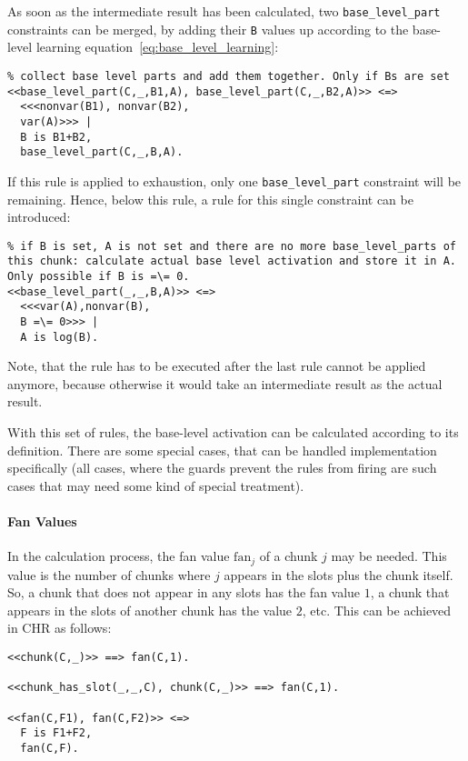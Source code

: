 As soon as the intermediate result has been calculated, two \verb|base_level_part| constraints can be merged, by adding their \verb|B| values up according to the base-level learning equation~\eqref{eq:base_level_learning}:

\begin{lstlisting}
% collect base level parts and add them together. Only if Bs are set
<<base_level_part(C,_,B1,A), base_level_part(C,_,B2,A)>> <=>
  <<<nonvar(B1), nonvar(B2), 
  var(A)>>> |
  B is B1+B2,
  base_level_part(C,_,B,A).
\end{lstlisting}

If this rule is applied to exhaustion, only one \verb|base_level_part| constraint will be remaining. Hence, below this rule, a rule for this single constraint can be introduced:

\begin{lstlisting}
% if B is set, A is not set and there are no more base_level_parts of this chunk: calculate actual base level activation and store it in A. Only possible if B is =\= 0.
<<base_level_part(_,_,B,A)>> <=>
  <<<var(A),nonvar(B), 
  B =\= 0>>> |
  A is log(B).
\end{lstlisting}

Note, that the rule has to be executed after the last rule cannot be applied anymore, because otherwise it would take an intermediate result as the actual result.

With this set of rules, the base-level activation can be calculated according to its definition. There are some special cases, that can be handled implementation specifically (all cases, where the guards prevent the rules from firing are such cases that may need some kind of special treatment).

\paragraph{Fan Values}

In the calculation process, the fan value $\mathrm{fan}_j$ of a chunk $j$ may be needed. This value is the number of chunks where $j$ appears in the slots plus the chunk itself. So, a chunk that does not appear in any slots has the fan value $1$, a chunk that appears in the slots of another chunk has the value $2$, etc. This can be achieved in CHR as follows:

\begin{lstlisting}
<<chunk(C,_)>> ==> fan(C,1).

<<chunk_has_slot(_,_,C), chunk(C,_)>> ==> fan(C,1).

<<fan(C,F1), fan(C,F2)>> <=> 
  F is F1+F2, 
  fan(C,F).
\end{lstlisting}

